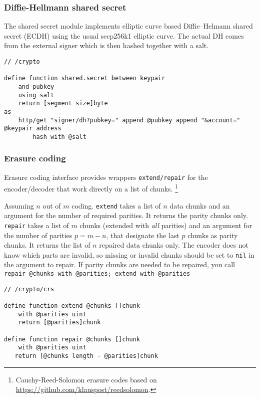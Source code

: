 \subsubsection{Diffie-Hellmann shared secret}

The shared secret module implements elliptic curve based Diffie--Helmann shared secret (ECDH) using the usual secp256k1 elliptic curve.
The actual DH comes from the external signer which is then hashed together with a salt.

\begin{definition}\label{def:dh}
\begin{lstlisting}[language=buzz1]
// /crypto

define function shared.secret between keypair
    and pubkey
    using salt
    return [segment size]byte
as
    http/get "signer/dh?pubkey=" append @pubkey append "&account=" @keypair address
        hash with @salt

\end{lstlisting}
\end{definition}  

\subsubsection{Erasure coding}\label{spec:format:erasure}

Erasure coding interface provides wrappers \lstinline{extend/repair} for the encoder/decoder that work directly on a list of chunks.%
%
\footnote{Cauchy-Reed-Solomon erasure codes based on \url{https://github.com/klauspost/reedsolomon}.
}

Assuming $n$ out of $m$ coding.
\lstinline{extend} takes a list of $n$ data chunks and an argument for the number of required parities. It returns the parity chunks only.
\lstinline{repair} takes a list of $m$ chunks (extended with \emph{all} parities) and an argument for the number of parities $p=m-n$, that designate the last $p$ chunks as parity chunks. It returns the list of $n$ repaired data chunks only.
The encoder does not know which parts are invalid, so missing or invalid chunks should be set to \lstinline{nil} in the argument to repair.
If parity chunks are needed to be repaired, you call \lstinline{repair @chunks with @parities; extend with @parities}

\begin{definition}\label{def:crs}
\begin{lstlisting}[language=buzz1]
// /crypto/crs

define function extend @chunks []chunk 
    with @parities uint
    return [@parities]chunk

define function repair @chunks []chunk   
    with @parities uint
   return [@chunks length - @parities]chunk

\end{lstlisting}
\end{definition}

